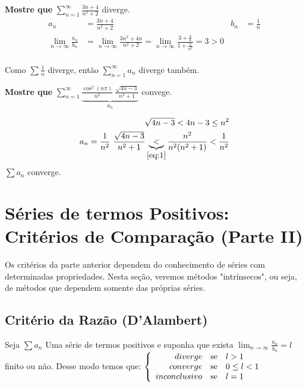 \documentclass[12pt,openany, letterpaper]{book}
\begin{document}
\hspace{5mm} \textbf{Mostre que} $\displaystyle{\sum_{n=1}^{\infty} \frac{3n + 4}{n^2 + 2}}$ diverge.
\begin{align*}
a_n &= \frac{3n + 4}{n^2 + 2} & b_n &= \frac{1}{n} \\
\lim_{n \rightarrow \infty} \frac{a_n}{b_n} &= \lim_{n \rightarrow \infty} \frac{3n^2 + 4n}{n^2 + 2} = \lim_{n \rightarrow \infty} \frac{3 + \frac{4}{n}}{1 + \frac{2}{n^2}} = 3 > 0 \\
\end{align*}

Como $\sum \frac{1}{n}$ diverge, então $\sum_{n = 1}^{\infty} a_n$ diverge também. \vspace{7mm}

\hspace{5mm} \textbf{Mostre que} $\displaystyle{\sum_{n=1}^{\infty} \underbrace{\frac{\cos^2(n\pi)}{n^2}\ \frac{\sqrt{4n-3}}{n^2+1}}_{a_n}}$ convege.

\begin{align}
\sqrt{4n-3} < 4n-3 \leq n^2 \label{eq:1} \\
a_n = \frac{1}{n^2} \ \frac{\sqrt{4n-3}}{n^2 + 1} \underbrace{<}_{\ref{eq:1}} \frac{n^2}{n^2(n^2+1)} < \frac{1}{n^2} \\
\end{align}
$\sum a_n$ converge.

\section{Séries de termos Positivos: Critérios de Comparação (Parte II)}
\label{sec:s210}

\hspace{5mm}Os critérios da parte anterior dependem do conhecimento de séries com determinadas propriedades. Nesta seção, veremos métodos "intrínsecos", ou seja, de métodos que dependem somente das próprias séries.

\subsection{Critério da Razão (D'Alambert)}
Seja $\sum a_n$ Uma série de termos positivos e suponha que exista $\displaystyle{\lim_{n \rightarrow \infty} \frac{a_n}{b_n} = l}$ finito ou não. Desse modo temos que: $\left\{ \begin{array}{rlll}
diverge & \hbox{se} &  l > 1 \\
converge & \hbox{se} & 0 \leq l < 1 \\
inconclusivo & \hbox{se} & l = 1 \\
\end{array}\right.$
\end{document}
